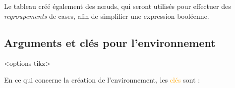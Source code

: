 \documentclass[french,a4paper,11pt]{article}
\newcommand\Cle[1]{{\small\sffamily\textlangle \textcolor{orange}{#1}\textrangle}}
\begin{document}
{{\begin{DemoCode}[]
\begin{TableKarnaugh}[Aide]
\end{TableKarnaugh}
\hspace{0.25cm}
\begin{TableKarnaugh}[Variables=u/v/w]
\end{TableKarnaugh}
\hspace{0.25cm}
\begin{TableKarnaugh}[Variables=u/v/w,Swap]
\end{TableKarnaugh}

\begin{center}
	\begin{TableKarnaugh}[Legende=false,Unite=1.5cm,Epaisseur=1.5pt,Couleur=brown]
	\end{TableKarnaugh}
\end{center}
\end{DemoCode}

\begin{tipblock}
Le tableau créé également des nœuds, qui seront utilisés pour effectuer des \textit{regroupements} de cases, afin de simplifier une expression booléenne.
\end{tipblock}

\subsection{Arguments et clés pour l'environnement}

\begin{DemoCode}
\begin{TableKarnaugh}[clés]<options tikz>
\end{TableKarnaugh}
\end{DemoCode}

\begin{tipblock}
En ce qui concerne la création de l'environnement, les \Cle{clés} sont :


\end{tipblock}}}
\end{document}
